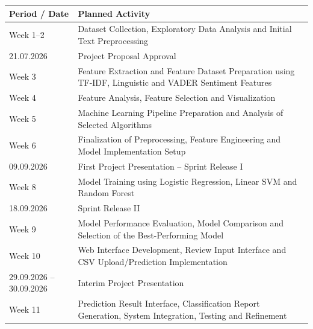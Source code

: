 \documentclass[12pt,a4paper]{report}
\begin{document}
\begin{table}[H]
\centering
\renewcommand{\arraystretch}{1.5}
\setlength{\tabcolsep}{8pt}

\begin{tabularx}{\textwidth}{|>{\raggedright\arraybackslash}p{3.5cm}|X|}
\hline
\textbf{Period / Date} & \textbf{Planned Activity} \\
\hline

Week 1--2 &
Dataset Collection, Exploratory Data Analysis and Initial Text Preprocessing \\
\hline

21.07.2026 &
Project Proposal Approval \\
\hline

Week 3 &
Feature Extraction and Feature Dataset Preparation using TF-IDF, Linguistic and VADER Sentiment Features \\
\hline

Week 4 &
Feature Analysis, Feature Selection and Visualization \\
\hline

Week 5 &
Machine Learning Pipeline Preparation and Analysis of Selected Algorithms \\
\hline

Week 6 &
Finalization of Preprocessing, Feature Engineering and Model Implementation Setup \\
\hline

09.09.2026 &
First Project Presentation -- Sprint Release I \\
\hline

Week 8 &
Model Training using Logistic Regression, Linear SVM and Random Forest \\
\hline

18.09.2026 &
Sprint Release II \\
\hline

Week 9 &
Model Performance Evaluation, Model Comparison and Selection of the Best-Performing Model \\
\hline

Week 10 &
Web Interface Development, Review Input Interface and CSV Upload/Prediction Implementation \\
\hline

29.09.2026 -- 30.09.2026 &
Interim Project Presentation \\
\hline

Week 11 &
Prediction Result Interface, Classification Report Generation, System Integration, Testing and Refinement \\
\hline


\end{tabularx}
\end{table}
\end{document}
